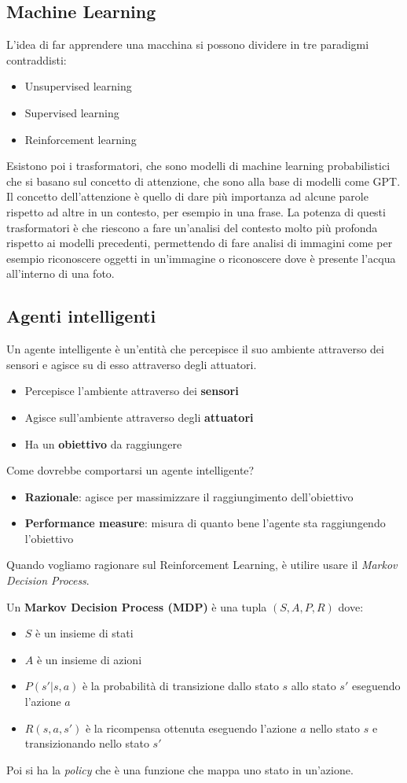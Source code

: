 \documentclass[a4paper]{article}
\begin{document}
\subsection{Machine Learning}
L'idea di far apprendere una macchina si possono dividere in tre paradigmi contraddisti:
\begin{itemize}
    \item Unsupervised learning
    \item Supervised learning
    \item Reinforcement learning
\end{itemize}
Esistono poi i trasformatori, che sono modelli di machine learning probabilistici che si basano sul concetto di attenzione, che sono alla base di modelli come GPT.
Il concetto dell'attenzione è quello di dare più importanza ad alcune parole rispetto ad altre in un contesto, per esempio in una frase.
La potenza di questi trasformatori è che riescono a fare un'analisi del contesto molto più profonda rispetto ai modelli precedenti, 
permettendo di fare analisi di immagini come per esempio riconoscere oggetti in un'immagine o riconoscere dove è presente l'acqua
all'interno di una foto.

\subsection{Agenti intelligenti}

Un agente intelligente è un'entità che percepisce il suo ambiente attraverso dei sensori e agisce su di esso attraverso degli attuatori.
\begin{itemize}
    \item Percepisce l'ambiente attraverso dei \textbf{sensori}
    \item Agisce sull'ambiente attraverso degli \textbf{attuatori}
    \item Ha un \textbf{obiettivo} da raggiungere
\end{itemize}
Come dovrebbe comportarsi un agente intelligente?
\begin{itemize}
    \item \textbf{Razionale}: agisce per massimizzare il raggiungimento dell'obiettivo
    \item \textbf{Performance measure}: misura di quanto bene l'agente sta raggiungendo l'obiettivo
\end{itemize}
Quando vogliamo ragionare sul Reinforcement Learning, è utilire usare il \textit{Markov Decision Process}.
\dfn{}
{
    Un \textbf{Markov Decision Process (MDP)} è una tupla $(S, A, P, R)$ dove:
    \begin{itemize}
        \item $S$ è un insieme di stati
        \item $A$ è un insieme di azioni
        \item $P(s'|s,a)$ è la probabilità di transizione dallo stato $s$ allo stato $s'$ eseguendo l'azione $a$
        \item $R(s,a,s')$ è la ricompensa ottenuta eseguendo l'azione $a$ nello stato $s$ e transizionando nello stato $s'$
    \end{itemize}
}
\noindent
Poi si ha la \textit{policy} che è una funzione che mappa uno stato in un'azione. 
\end{document}
